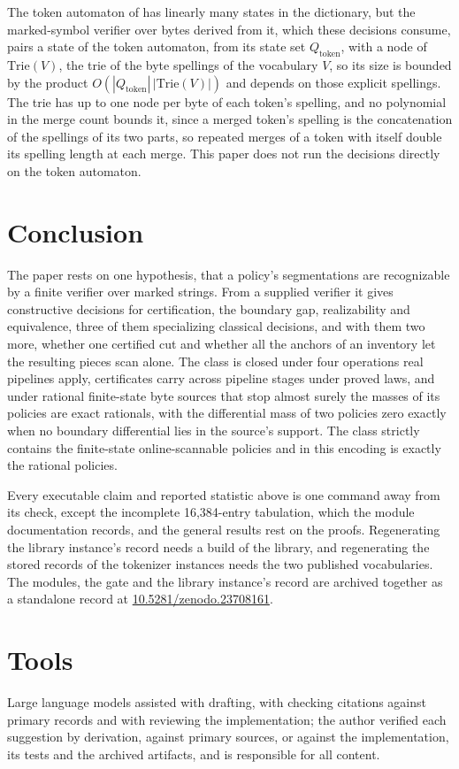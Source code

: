 \documentclass[11pt,a4paper]{article}
\theoremstyle{definition}
\theoremstyle{plain}
\begin{document}
The token automaton of \citet{berglund2024bpedfa} has linearly many states in the dictionary, but the marked-symbol
verifier over bytes derived from it, which these decisions consume, pairs a state of the token automaton, from its state
set $Q_{\mathrm{token}}$, with a node of $\mathrm{Trie}(V)$, the trie of the byte spellings of the vocabulary $V$, so
its size is bounded by the product $O(|Q_{\mathrm{token}}|\,|\mathrm{Trie}(V)|)$ and depends on those explicit
spellings. The trie has up to one node per byte of each token's spelling, and no polynomial in the merge count bounds
it, since a merged token's spelling is the concatenation of the spellings of its two parts, so repeated merges of a
token with itself double its spelling length at each merge. This paper does not run the decisions directly on the token
automaton.

\section{Conclusion}

The paper rests on one hypothesis, that a policy's segmentations are recognizable by a finite verifier over marked
strings. From a supplied verifier it gives constructive decisions for certification, the boundary gap, realizability and
equivalence, three of them specializing classical decisions, and with them two more, whether one certified cut and
whether all the anchors of an inventory let the resulting pieces scan alone. The class is closed under four operations
real pipelines apply, certificates carry across pipeline stages under proved laws, and under rational finite-state byte
sources that stop almost surely the masses of its policies are exact rationals, with the differential mass of two
policies zero exactly when no boundary differential lies in the source's support. The class strictly contains the
finite-state online-scannable policies and in this encoding is exactly the rational policies.

Every executable claim and reported statistic above is one command away from its check, except the incomplete
16{,}384-entry tabulation, which the module documentation records, and the general results rest on the proofs.
Regenerating the library instance's record needs a build of the library, and regenerating the stored records of the
tokenizer instances needs the two published vocabularies. The modules, the gate and the library instance's record are
archived together as a standalone record at
\href{https://doi.org/10.5281/zenodo.23708161}{\mbox{10.5281/zenodo.23708161}}.

\section*{Tools}

Large language models assisted with drafting, with checking citations against primary records and with reviewing the
implementation; the author verified each suggestion by derivation, against primary sources, or against the
implementation, its tests and the archived artifacts, and is responsible for all content.

\setlength{\bibsep}{1pt}


\end{document}
